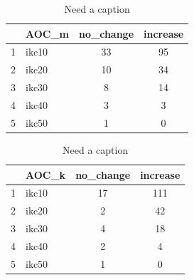 \documentclass[11pt, oneside]{article}   	%
\begin{document}
\clearpage
\begin{table}[H]
\centering
\begin{tabular}{rlcc}
  \hline
 & AOC\_m & no\_change & increase \\ 
  \hline
1 & ikc10 &  33 &  95 \\ 
2 & ikc20 &  10 &  34 \\ 
3 & ikc30 &   8 &  14 \\ 
4 & ikc40 &   3 &   3 \\ 
5 & ikc50 &   1 &   0 \\ 
   \hline
\end{tabular}
\quad
\begin{tabular}{rlcc}
  \hline
 & AOC\_k& no\_change & increase \\ 
  \hline
1 & ikc10 &  17 & 111 \\ 
2 & ikc20 &   2 &  42 \\ 
3 & ikc30 &   4 &  18 \\ 
4 & ikc40 &   2 &   4 \\ 
5 & ikc50 &   1 &   0 \\ 
   \hline
\end{tabular}
\caption{Need a caption}
\label{tab:tab1}
\end{table}
\end{document}
